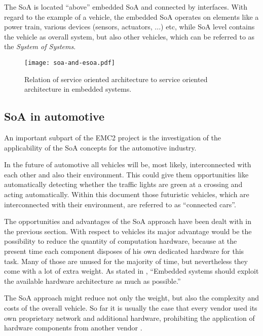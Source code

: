 The SoA is located ``above'' embedded SoA and connected by interfaces. With regard to the example of a vehicle, the embedded SoA operates on elements like a power train, various devices (sensors, actuators, ...) etc, while SoA level contains the vehicle as overall system, but also other vehicles, which can be referred to as the \emph{System of Systems}.


\begin{figure}[ht]
\centering
\texttt{[image: soa-and-esoa.pdf]}
\caption{Relation of service oriented architecture to service oriented architecture in embedded systems.}
\label{fig:soa-and-esoa}
\end{figure}









\subsection{SoA in automotive}

An important subpart of the EMC2 project is the investigation of the applicability of the SoA concepts for the automotive industry.

In the future of automotive all vehicles will be, most likely, interconnected with each other and also their environment. This could give them opportunities like automatically detecting whether the traffic lights are green at a crossing and acting automatically. Within this document those futuristic vehicles, which are interconnected with their environment, are referred to as ``connected cars''.




The opportunities and advantages of the SoA approach have been dealt with in the previous section. With respect to vehicles its major advantage would be the possibility to reduce the quantity of computation hardware, because at the present time each component disposes of his own dedicated hardware for this task. Many of those are unused for the majority of time, but nevertheless they come with a lot of extra weight. As stated in \cite[p.7]{marwedel}, ``Embedded systems should exploit the available hardware architecture as much as possible.''

The SoA approach might reduce not only the weight, but also the complexity and costs of the overall vehicle. So far it is usually the case that every vendor used its own proprietary network and additional hardware, prohibiting the application of hardware components from another vendor \cite{sommer}.

